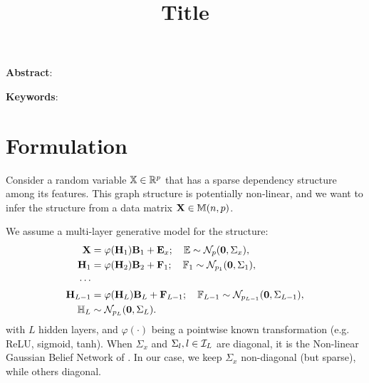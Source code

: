 \documentclass[11pt,letterpaper]{article}
\numberwithin{equation}{section}
\begin{document}
\newtheorem{Theorem}{Theorem}[section]
\newtheorem{Lemma}[Theorem]{Lemma}
\newtheorem{Corollary}[Theorem]{Corollary}
\newtheorem{Proposition}[Theorem]{Proposition}
\newtheorem{Conjecture}[Theorem]{Conjecture}
\theoremstyle{definition} \newtheorem{Definition}[Theorem]{Definition}
\newtheorem{Example}{Example}[section]
\newtheorem{Algorithm}{Algorithm}
\newtheorem{Remark}{Remark}

\title{Title}
\date{}
\maketitle

\noindent\textbf{Abstract}: 

\vspace{.5cm}
\noindent\textbf{Keywords}:

\section{Formulation}
Consider a random variable ${\mathbb{X}} \in {\mathbb{R}}^p$ that has a sparse dependency structure among its features. This graph structure is potentially non-linear, and we want to infer the structure from a data matrix ${\mathbf{X}} \in {\mathbb{M}}(n,p)$.

We assume a multi-layer generative model for the structure:
%
\begin{align*}
{\mathbf{X}} &= \varphi ({\mathbf{H}}_1) {\mathbf{B}}_1 + {\mathbf{E}}_x; \quad {\mathbb{E}} \sim {\cal{N}}_p ({\bf 0}, \Sigma_x),\\
{\mathbf{H}}_1 &= \varphi ({\mathbf{H}}_2) {\mathbf{B}}_2 + {\mathbf{F}}_1; \quad {\mathbb{F}}_1 \sim {\cal{N}}_{p_1} ({\bf 0}, \Sigma_1),\\
\cdots\\
{\mathbf{H}}_{L-1} &=
\varphi ({\mathbf{H}}_L) {\mathbf{B}}_L + {\mathbf{F}}_{L-1}; \quad {\mathbb{F}}_{L-1} \sim {\cal{N}}_{p_{L-1}} ({\bf 0}, \Sigma_{L-1}),\\
{\mathbb{H}}_L & \sim {\cal{N}}_{p_L} ({\bf 0}, \Sigma_L).
\end{align*}
%
with $L$ hidden layers, and $\varphi(\cdot)$ being a pointwise known transformation (e.g. ReLU, sigmoid, tanh).
When $\Sigma_x$ and $\Sigma_l, l \in {\cal{I}}_L$ are diagonal, it is the Non-linear Gaussian Belief Network of \cite{FreyHinton99}. In our case, we keep $\Sigma_x$ non-diagonal (but sparse), while others diagonal.
\end{document}
